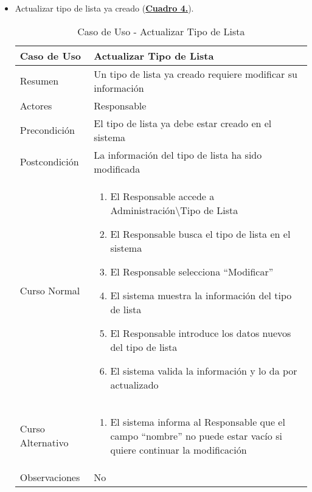 \begin{itemize}
	\pagebreak
	\item \addtocounter{tabla}{1} Actualizar tipo de lista ya creado (\textbf{\hyperref[tab:curActualizarTipoLst]{Cuadro 4.}}).
		\begin{table}[!htbp]
		  \centering  \addtocounter{casouso}{1}
		  \begin{tabular}{|l | p{100mm}|}
		    \textbf{Caso de Uso}  & \textbf{Actualizar Tipo de Lista} \\ \hline
		    Resumen 		 & Un tipo de lista ya creado requiere modificar su información \\ \hline
		    Actores  		 & Responsable \\ \hline
		    Precondición  	 & El tipo de lista ya debe estar creado en el sistema  \\ \hline
		    Postcondición  	 & La información del tipo de lista ha sido modificada \\ \hline
		    Curso Normal   	 & \begin{enumerate}
			  \item El Responsable accede a Administración\textbackslash Tipo de Lista
			  \item El Responsable busca el tipo de lista en el sistema
			  \item El Responsable selecciona ``Modificar''
			  \item El sistema muestra la información del tipo de lista
			  \item El Responsable introduce los datos nuevos del tipo de lista
			  \item El sistema valida la información y lo da por actualizado
		    \end{enumerate}  \\ \hline
		    Curso Alternativo  & \begin{enumerate}
			  \item El sistema informa al Responsable que el campo ``nombre'' no puede estar vacío si quiere continuar la modificación
		    \end{enumerate}  \\ \hline
		    Observaciones 	 & No  \\ \hline
		  \end{tabular}
		  \caption{Caso de Uso  - Actualizar Tipo de Lista}
		  \label{tab:curActualizarTipoLst}
		\end{table}
		\FloatBarrier
\end{itemize}

